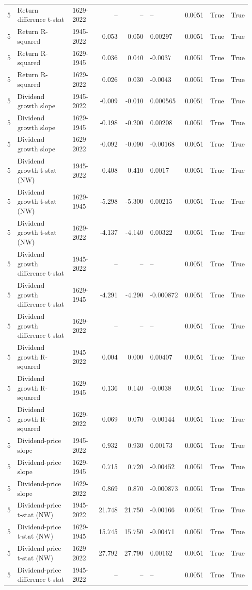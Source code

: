 \documentclass[10pt]{article}
\begin{document}
\begin{landscape}
\begin{longtable}{rllrrllrr}
5 & Return difference t-stat & 1629-2022 & -- & -- & -- & 0.0051 & True & True \\
5 & Return R-squared & 1945-2022 & 0.053 & 0.050 & 0.00297 & 0.0051 & True & True \\
5 & Return R-squared & 1629-1945 & 0.036 & 0.040 & -0.0037 & 0.0051 & True & True \\
5 & Return R-squared & 1629-2022 & 0.026 & 0.030 & -0.0043 & 0.0051 & True & True \\
5 & Dividend growth slope & 1945-2022 & -0.009 & -0.010 & 0.000565 & 0.0051 & True & True \\
5 & Dividend growth slope & 1629-1945 & -0.198 & -0.200 & 0.00208 & 0.0051 & True & True \\
5 & Dividend growth slope & 1629-2022 & -0.092 & -0.090 & -0.00168 & 0.0051 & True & True \\
5 & Dividend growth t-stat (NW) & 1945-2022 & -0.408 & -0.410 & 0.0017 & 0.0051 & True & True \\
5 & Dividend growth t-stat (NW) & 1629-1945 & -5.298 & -5.300 & 0.00215 & 0.0051 & True & True \\
5 & Dividend growth t-stat (NW) & 1629-2022 & -4.137 & -4.140 & 0.00322 & 0.0051 & True & True \\
5 & Dividend growth difference t-stat & 1945-2022 & -- & -- & -- & 0.0051 & True & True \\
5 & Dividend growth difference t-stat & 1629-1945 & -4.291 & -4.290 & -0.000872 & 0.0051 & True & True \\
5 & Dividend growth difference t-stat & 1629-2022 & -- & -- & -- & 0.0051 & True & True \\
5 & Dividend growth R-squared & 1945-2022 & 0.004 & 0.000 & 0.00407 & 0.0051 & True & True \\
5 & Dividend growth R-squared & 1629-1945 & 0.136 & 0.140 & -0.0038 & 0.0051 & True & True \\
5 & Dividend growth R-squared & 1629-2022 & 0.069 & 0.070 & -0.00144 & 0.0051 & True & True \\
5 & Dividend-price slope & 1945-2022 & 0.932 & 0.930 & 0.00173 & 0.0051 & True & True \\
5 & Dividend-price slope & 1629-1945 & 0.715 & 0.720 & -0.00452 & 0.0051 & True & True \\
5 & Dividend-price slope & 1629-2022 & 0.869 & 0.870 & -0.000873 & 0.0051 & True & True \\
5 & Dividend-price t-stat (NW) & 1945-2022 & 21.748 & 21.750 & -0.00166 & 0.0051 & True & True \\
5 & Dividend-price t-stat (NW) & 1629-1945 & 15.745 & 15.750 & -0.00471 & 0.0051 & True & True \\
5 & Dividend-price t-stat (NW) & 1629-2022 & 27.792 & 27.790 & 0.00162 & 0.0051 & True & True \\
5 & Dividend-price difference t-stat & 1945-2022 & -- & -- & -- & 0.0051 & True & True \\
\end{longtable}


\end{landscape}
\end{document}
